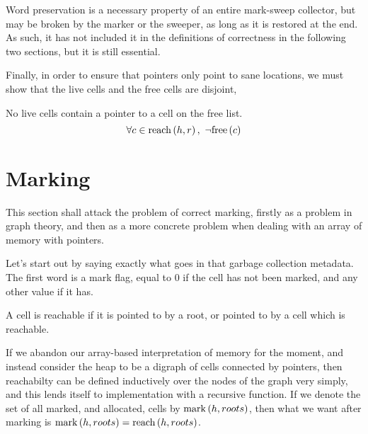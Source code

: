 Word preservation is a necessary property of an entire mark-sweep
collector, but may be broken by the marker or the sweeper, as long as
it is restored at the end. As such, it has not included it in the
definitions of correctness in the following two sections, but it is
still essential.

Finally, in order to ensure that pointers only point to sane
locations, we must show that the live cells and the free cells are
disjoint,

\begin{definition}
  \label{def:ms-live-cell-invariant}
  No live cells contain a pointer to a cell on the free list.
  \[\forall c \in \reach{h}{r},\ \lnot\free{c}\]
\end{definition}

\section{Marking}
\label{sec:marksweep-marking}

This section shall attack the problem of correct marking, firstly as a
problem in graph theory, and then as a more concrete problem when
dealing with an array of memory with pointers.

Let's start out by saying exactly what goes in that garbage collection
metadata. The first word is a mark flag, equal to 0 if the cell has
not been marked, and any other value if it has.

\begin{definition}[Reachable]
  \label{def:ms-reachable}
  A cell is reachable if it is pointed to by a root, or pointed to by
  a cell which is reachable.

  \begin{minipage}{.5\textwidth}
    \begin{prooftree}
    \end{prooftree}
  \end{minipage}
  \begin{minipage}{.5\textwidth}
    \begin{prooftree}
    \end{prooftree}
  \end{minipage}
\end{definition}

If we abandon our array-based interpretation of memory for the moment,
and instead consider the heap to be a digraph of cells connected by
pointers, then reachabilty can be defined inductively over the nodes
of the graph very simply, and this lends itself to implementation with
a recursive function. If we denote the set of all marked, and
allocated, cells by $\markset{h}{roots}$, then what we want after
marking is $\markset{h}{roots} = \reach{h}{roots}$.

